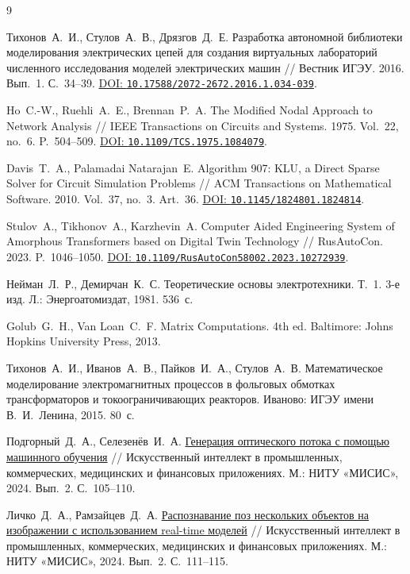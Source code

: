 \documentclass{misisarticle}
\begin{document}
\begin{thebibliography}{9}

Тихонов~А.~И., Стулов~А.~В., Дрязгов~Д.~Е.
Разработка автономной библиотеки моделирования электрических цепей для создания виртуальных лабораторий численного исследования моделей электрических машин //
Вестник ИГЭУ. 2016. Вып.~1. С.~34--39.
\href{https://doi.org/10.17588/2072-2672.2016.1.034-039}{DOI: \nolinkurl{10.17588/2072-2672.2016.1.034-039}}.

Ho~C.-W., Ruehli~A.~E., Brennan~P.~A.
The Modified Nodal Approach to Network Analysis //
IEEE Transactions on Circuits and Systems. 1975. Vol.~22, no.~6. P.~504--509.
\href{https://doi.org/10.1109/TCS.1975.1084079}{DOI: \nolinkurl{10.1109/TCS.1975.1084079}}.

Davis~T.~A., Palamadai Natarajan~E.
Algorithm 907: KLU, a Direct Sparse Solver for Circuit Simulation Problems //
ACM Transactions on Mathematical Software. 2010. Vol.~37, no.~3. Art.~36.
\href{https://doi.org/10.1145/1824801.1824814}{DOI: \nolinkurl{10.1145/1824801.1824814}}.

Stulov~A., Tikhonov~A., Karzhevin~A.
Computer Aided Engineering System of Amorphous Transformers based on Digital Twin Technology //
RusAutoCon. 2023. P.~1046--1050.
\href{https://doi.org/10.1109/RusAutoCon58002.2023.10272939}{DOI: \nolinkurl{10.1109/RusAutoCon58002.2023.10272939}}.

Нейман~Л.~Р., Демирчан~К.~С.
Теоретические основы электротехники. Т.~1. 3-е изд.
Л.: Энергоатомиздат, 1981. 536~с.

Golub~G.~H., Van Loan~C.~F.
Matrix Computations. 4th ed. Baltimore: Johns Hopkins University Press, 2013.

Тихонов~А.~И., Иванов~А.~В., Пайков~И.~А., Стулов~А.~В.
Математическое моделирование электромагнитных процессов в фольговых обмотках трансформаторов и токоограничивающих реакторов.
Иваново: ИГЭУ имени В.~И.~Ленина, 2015. 80~с.

Подгорный~Д.~А., Селезенёв~И.~А.
\href{https://misis.ru/files/-/7914c2bff86d1a41832cf9bc14e3de9b/kik_2024_1.pdf\#page=106}{Генерация оптического потока с помощью машинного обучения} //
Искусственный интеллект в промышленных, коммерческих, медицинских и финансовых приложениях.
М.: НИТУ «МИСИС», 2024. Вып.~2. С.~105--110.

Личко~Д.~А., Рамзайцев~Д.~А.
\href{https://misis.ru/files/-/7914c2bff86d1a41832cf9bc14e3de9b/kik_2024_1.pdf\#page=112}{Распознавание поз нескольких объектов на изображении с использованием real-time моделей} //
Искусственный интеллект в промышленных, коммерческих, медицинских и финансовых приложениях.
М.: НИТУ «МИСИС», 2024. Вып.~2. С.~111--115.

\end{thebibliography}
\end{document}
